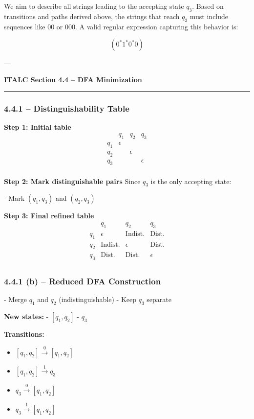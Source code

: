 \documentclass{article}
\theoremstyle{theorem}
\theoremstyle{definition}
\theoremstyle{remark}
\begin{document}
We aim to describe all strings leading to the accepting state \( q_3 \). Based on transitions and paths derived above, the strings that reach \( q_3 \) must include sequences like 00 or 000. A valid regular expression capturing this behavior is:

\[
(0^*1^*0^*0)
\]

---

\textbf{ITALC Section 4.4 – DFA Minimization} 
\vspace{0.5em}
\hrule
\vspace{0.5em}

\subsubsection*{4.4.1 – Distinguishability Table}

\textbf{Step 1: Initial table}
\[
\begin{array}{c|ccc}
     & q_1 & q_2 & q_3 \\
\hline
q_1 & \epsilon &     &     \\
q_2 &          & \epsilon &     \\
q_3 &          &          & \epsilon \\
\end{array}
\]

\textbf{Step 2: Mark distinguishable pairs}  
Since \( q_3 \) is the only accepting state:

- Mark \( (q_1, q_3) \) and \( (q_2, q_3) \)

\textbf{Step 3: Final refined table}
\[
\begin{array}{c|ccc}
     & q_1 & q_2 & q_3 \\
\hline
q_1 & \epsilon & \text{Indist.} & \text{Dist.} \\
q_2 & \text{Indist.} & \epsilon & \text{Dist.} \\
q_3 & \text{Dist.} & \text{Dist.} & \epsilon \\
\end{array}
\]

\subsubsection*{4.4.1 (b) – Reduced DFA Construction}

- Merge \( q_1 \) and \( q_2 \) (indistinguishable)
- Keep \( q_3 \) separate

\textbf{New states:}  
- \( [q_1, q_2] \)  
- \( q_3 \)

\textbf{Transitions:}
\begin{itemize}
    \item \( [q_1, q_2] \xrightarrow{0} [q_1, q_2] \)
    \item \( [q_1, q_2] \xrightarrow{1} q_3 \)
    \item \( q_3 \xrightarrow{0} [q_1, q_2] \)
    \item \( q_3 \xrightarrow{1} [q_1, q_2] \)
\end{itemize}
\end{document}
